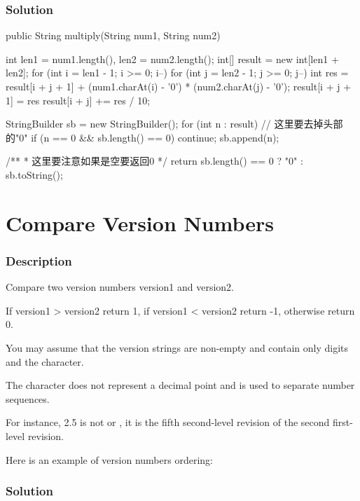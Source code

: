 \subsubsection{Solution}

\begin{Code}
public String multiply(String num1, String num2) {
    int len1 = num1.length(), len2 = num2.length();
    int[] result = new int[len1 + len2];
    for (int i = len1 - 1; i >= 0; i--) {
        for (int j = len2 - 1; j >= 0; j--) {
            int res = result[i + j + 1] + (num1.charAt(i) - '0') * (num2.charAt(j) - '0');
            result[i + j + 1] = res %
            result[i + j] += res / 10;
        }
    }

    StringBuilder sb = new StringBuilder();
    for (int n : result) {
        // 这里要去掉头部的"0"
        if (n == 0 && sb.length() == 0) {
            continue;
        }
        sb.append(n);
    }

    /**
     * 这里要注意如果是空要返回0
     */
    return sb.length() == 0 ? "0" : sb.toString();
}
\end{Code}

\newpage

\section{Compare Version Numbers} %

\subsubsection{Description}
Compare two version numbers version1 and version2.

If version1 > version2 return 1, if version1 < version2 return -1, otherwise return 0.

You may assume that the version strings are non-empty and contain only digits and the  character.

The  character does not represent a decimal point and is used to separate number sequences.

For instance, 2.5 is not  or , it is the fifth second-level revision of the second first-level revision.

Here is an example of version numbers ordering:


\subsubsection{Solution}

